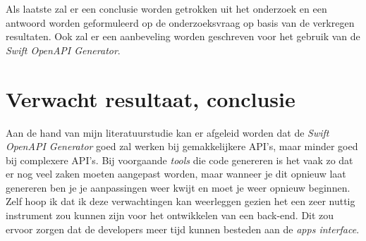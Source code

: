 Als laatste zal er een conclusie worden getrokken uit het onderzoek en een antwoord worden geformuleerd op de onderzoeksvraag op basis van de verkregen resultaten. Ook zal er een aanbeveling worden geschreven voor het gebruik van de \textit{Swift OpenAPI Generator}. 



\section{Verwacht resultaat, conclusie}%
\label{sec:verwachte_resultaten}

Aan de hand van mijn literatuurstudie kan er afgeleid worden dat de \textit{Swift OpenAPI Generator} goed zal werken bij gemakkelijkere API’s, maar minder goed bij complexere API’s. Bij voorgaande \textit{tools} die code genereren is het vaak zo dat er nog veel zaken moeten aangepast worden, maar wanneer je dit opnieuw laat genereren ben je je aanpassingen weer kwijt en moet je weer opnieuw beginnen. Zelf hoop ik dat ik deze verwachtingen kan weerleggen gezien het een zeer nuttig instrument zou kunnen zijn voor het ontwikkelen van een back-end. Dit zou ervoor zorgen dat de developers meer tijd kunnen besteden aan de \textit{apps interface}. 